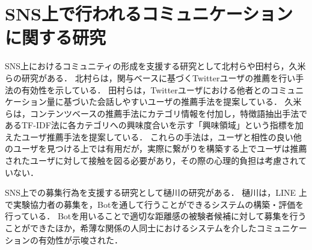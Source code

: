 \section{SNS上で行われるコミュニケーションに関する研究}

SNS上におけるコミュニティの形成を支援する研究として北村ら\cite{Kitamura}や田村ら\cite{Tamura}，久米ら\cite{Kume}の研究がある．
北村らは，関与ベースに基づくTwitterユーザの推薦を行い手法の有効性を示している．
田村らは，Twitterユーザにおける他者とのコミュニケーション量に基づいた会話しやすいユーザの推薦手法を提案している．
久米らは，コンテンツベースの推薦手法にカテゴリ情報を付加し，特徴語抽出手法であるTF-IDF法に各カテゴリへの興味度合いを示す「興味領域」という指標を加えたユーザ推薦手法を提案している．
これらの手法は，ユーザと相性の良い他のユーザを見つける上では有用だが，実際に繋がりを構築する上でユーザは推薦されたユーザに対して接触を図る必要があり，その際の心理的負担は考慮されていない．

SNS上での募集行為を支援する研究として樋川\cite{Hikawa}の研究がある．
樋川は，LINE \cite{LINE}上で実験協力者の募集を，Botを通して行うことができるシステムの構築・評価を行っている．
Botを用いることで適切な距離感の被験者候補に対して募集を行うことができたほか，希薄な関係の人同士におけるシステムを介したコミュニケーションの有効性が示唆された．

